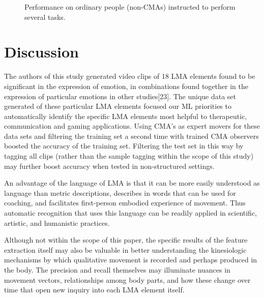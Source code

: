 \documentclass{sigchi}
\begin{document}
\begin{figure}[ht!]
\centering
{}
\caption{Performance on ordinary people (non-CMAs) instructed to
perform several tasks.}
\label{nonCMAs}
\end{figure}

\section{Discussion}
The authors of this study generated video clips of 18 LMA elements found to be significant in the expression of emotion, in combinations found together in the expression of particular emotions in other studies[23].  The unique data set generated of these particular LMA elements focused our ML priorities to automatically identify the specific LMA elements most helpful to therapeutic, communication and gaming applications.   Using CMA's as expert movers for these data sets and filtering the training set a second time with trained CMA observers boosted the accuracy of the training set.   Filtering the test set in this way by tagging all clips (rather than the sample tagging within the scope of this study) may further boost  accuracy when tested in non-structured settings.      

An advantage of the language of LMA is that it can be more easily understood as language  than metric descriptions, describes in words that can be used for coaching, and facilitates first-person embodied experience of movement. Thus automatic recognition that uses this language can be readily applied in scientific, artistic, and humanistic practices.

Although not within the scope of this paper, the specific results of the feature extraction itself may also be valuable in better understanding the kinesiologic mechanisms by which qualitative movement is recorded and perhaps produced in the body.   The precision and recall themselves may illuminate nuances in movement vectors, relationships among body parts, and how these change over time that open new inquiry into each LMA element itself. 
\end{document}
